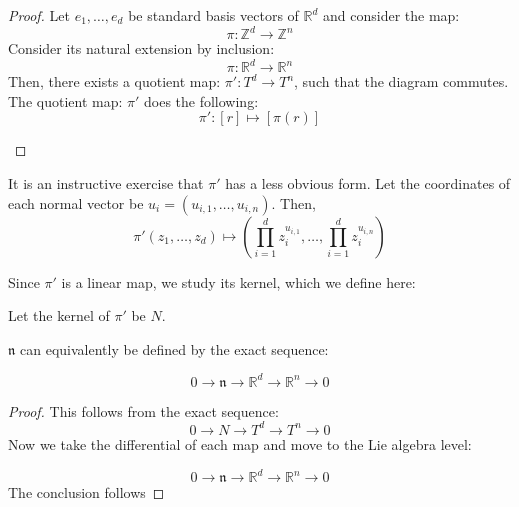 \begin{proof}
Let $e_{1}, \dots, e_{d}$ be standard basis vectors of $\mathbb{R}^{d}$ and consider the map:
\begin{equation}
\pi: \mathbb{Z}^{d} \to \mathbb{Z}^{n} 
\end{equation}
Consider its natural extension by inclusion:
\begin{equation}
\pi: \mathbb{R}^{d} \to \mathbb{R}^{n} 
\end{equation}
Then, there exists a quotient map: $\pi': T^{d} \to T^{n}$, such that the diagram commutes. The quotient map: $\pi'$ does the following:
\begin{equation}
\pi': [r] \mapsto [\pi(r)] 
\end{equation}
\begin{center}
\end{center}
\end{proof}

\begin{remark}
\label{NSpaceRemark}
It is an instructive exercise that $\pi'$ has a less obvious form. Let the coordinates of each normal vector be $u_{i} = (u_{i,1}, \dots, u_{i,n})$. Then,
\begin{equation}
\pi'(z_{1}, \dots, z_{d}) \mapsto (\prod_{i=1}^{d} z_{i}^{u_{i,1}}, \dots, \prod_{i=1}^{d} z_{i}^{u_{i,n}})
\end{equation}
\end{remark}

Since $\pi'$ is a linear map, we study its kernel, which we define here:

\begin{defn}
Let the kernel of $\pi'$ be $N$. 
\end{defn}

\begin{lemma}
$\mathfrak{n}$ can equivalently be defined by the exact sequence:

$$0 \to \mathfrak{n} \to \mathbb{R}^{d} \to \mathbb{R}^{n} \to 0  $$
\end{lemma}
\begin{proof}
This follows from the exact sequence:
$$0 \to N \to T^{d} \to T^{n} \to 0$$
\noindent Now we take the differential of each map and move to the Lie algebra level:

$$0 \to \mathfrak{n} \to \mathbb{R}^{d} \to \mathbb{R}^{n} \to 0  $$
\noindent The conclusion follows
\end{proof}

